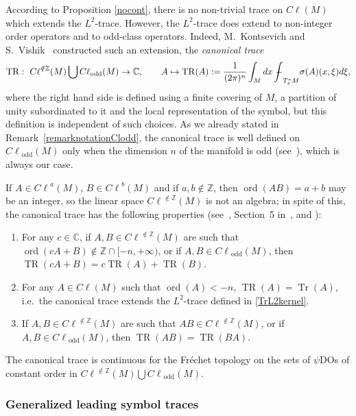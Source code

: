 \documentclass[pdftex]{sigma}
\DeclareMathOperator{\TR}{TR} \DeclareMathOperator{\Op}{Op}
\DeclareMathOperator{\Tr}{Tr} \DeclareMathOperator{\ord}{ord}
\DeclareMathOperator{\odd}{odd} \DeclareMathOperator{\supp}{supp}
\newcommand{\Z}{{\mathbb Z}}
\def \Cl {{C\ell}}
\begin{document}
According to Proposition \ref{nocont}, there is no non-trivial trace on $\Cl(M)$ which extends the $L^2$-trace. However, the $L^2$-trace does extend to non-integer order operators and to odd-class operators. Indeed, M.~Kontsevich and S.~Vishik~\cite{kontsevichdeterminant} constructed such an extension, the \emph{canonical trace}
\begin{gather*}
\TR: \ \Cl^{\notin\Z}(M)\bigcup\Cl_{\odd}(M) \to\mathbb{C},\qquad
 A  \mapsto\TR(A):=\dfrac{1}{(2\pi)^n}\int_Mdx\ {-\hskip -11,5pt\int}_{T_x^{*}M}\sigma(A)(x,\xi)d\xi,
\end{gather*}
where the right hand side is def\/ined using a f\/inite covering of $M$, a partition of unity subordinated to it and the local representation of the symbol, but this def\/inition is independent of such choices. As we already stated in Remark~\ref{remarknotationClodd}, the canonical trace is well def\/ined on $\Cl_{\odd}(M)$ only when the dimension $n$ of the manifold is odd (see~\cite{grubb,lesch}), which is always our case.

 If $A\in \Cl^{a}(M)$, $B\in \Cl^b(M)$ and if $a,b\notin\Z$, then $\ord(AB)=a+b$ may be an integer, so the linear space $\Cl^{\notin\Z}(M)$ is not an algebra; in spite of this, the canonical trace has the following properties (see~\cite{kontsevichdeterminant}, Section~5 in~\cite{lesch}, and \cite{ouedraogo,sylvie,scott}):
 \begin{enumerate}\itemsep=0pt
\item For any $c\in\mathbb{C}$, if $A,B\in\Cl^{\notin\Z}(M)$ are such that $\ord(c A+B)\notin\Z\cap[-n,+\infty)$, or if $A,B\in\Cl_{\odd}(M)$, then $\TR(c A+B)=c\TR(A)+\TR(B)$.
\item For any $A\in\Cl(M)$ such that $\ord(A)<-n$, $\TR(A)=\Tr(A)$, i.e.\ the canonical trace extends the $L^2$-trace def\/ined in \eqref{TrL2kernel}.
\item If $A,B\in\Cl^{\notin\Z}(M)$ are such that $AB\in\Cl^{\notin\Z}(M)$, or if $A,B\in\Cl_{\odd}(M)$, then $\TR(AB)=\TR(BA)$.
\end{enumerate}

The canonical trace is continuous for the Fr\'echet topology on the sets of $\psi$DOs of constant order in $\Cl^{\notin\Z}(M)\bigcup\Cl_{\odd}(M)$.

\subsubsection{Generalized leading symbol traces}\label{subsectiongeneralizedleadingsymboltrace}
\end{document}
